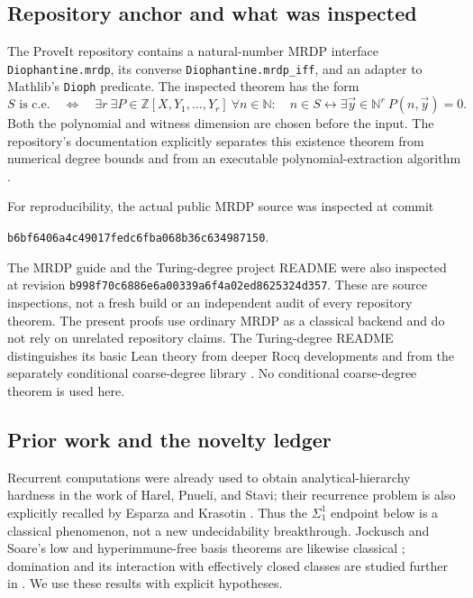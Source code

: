 \documentclass[11pt,letterpaper]{article}
\theoremstyle{definition}
\theoremstyle{remark}
\newcommand{\N}{\mathbb N}
\newcommand{\Z}{\mathbb Z}
\newcommand{\an}{\Sigma^{1}_{1}}
\newcommand{\code}[1]{\texttt{#1}}
\newcommand{\1}{\mathbf 1}
\begin{document}
\subsection{Repository anchor and what was inspected}
The ProveIt repository contains a natural-number MRDP interface
\code{Diophantine.mrdp}, its converse \code{Diophantine.mrdp\_iff}, and an
adapter to Mathlib's \code{Dioph} predicate. The inspected theorem has the form
\begin{equation}\label{lbh:eq:mrdp}
 S\text{ is c.e.}\quad\Longleftrightarrow\quad
 \exists r\ \exists P\in\Z[X,Y_1,\ldots,Y_r]\ 
 \forall n\in\N:\quad n\in S\leftrightarrow\exists\vec y\in\N^r\ P(n,\vec y)=0.
\end{equation}
Both the polynomial and witness dimension are chosen before the input.
The repository's documentation explicitly separates this existence theorem
from numerical degree bounds and from an executable polynomial-extraction
algorithm \cite{proveit-mrdp,proveit-guide}.

For reproducibility, the actual public MRDP source was inspected at commit
\begin{center}
\small\code{b6bf6406a4c49017fedc6fba068b36c634987150}.
\end{center}
The MRDP guide and the Turing-degree project README were also inspected at
revision \code{b998f70c6886e6a00339a6f4a02ed8625324d357}.
These are source inspections, not a fresh build or an independent audit of
every repository theorem. The present proofs use ordinary MRDP as a classical
backend and do not rely on unrelated repository claims. The Turing-degree
README distinguishes its basic Lean theory from deeper Rocq developments and
from the separately conditional coarse-degree library \cite{proveit-degrees}.
No conditional coarse-degree theorem is used here.

\subsection{Prior work and the novelty ledger}
Recurrent computations were already used to obtain analytical-hierarchy
hardness in the work of Harel, Pnueli, and Stavi; their recurrence problem is
also explicitly recalled by Esparza and Krasotin \cite{hps,ek2025}.
Thus the $\an$ endpoint below is a classical phenomenon, not a new
undecidability breakthrough. Jockusch and Soare's low and hyperimmune-free
basis theorems are likewise classical \cite{js1972}; domination and its
interaction with effectively closed classes are studied further in
\cite{ng2013}. We use these results with explicit hypotheses.
\end{document}

